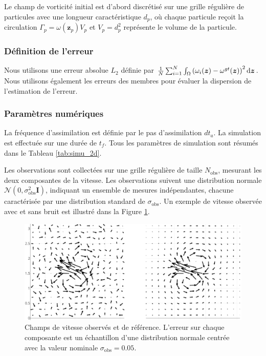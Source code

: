Le champ de vorticité initial est d'abord discrétisé sur une grille régulière de particules avec une longueur caractéristique \(d_p\), où chaque particule reçoit la circulation \(\Gamma_p = \omega(\bm{z}_p) V_p\) et \(V_p = d_p^2\) représente le volume de la particule.

\subsubsection{Définition de l'erreur}

Nous utilisons une erreur absolue \(L_2\) définie par $ \frac{1}{N} \sum_{i = 1}^{N} \int_\Omega \left(\omega_i(\bm{z}) - \omega^{gt}(\bm{z})\right)^2 \mathrm{d}\bm{z}$. Nous utilisons également les erreurs des membres pour évaluer la dispersion de l'estimation de l'erreur.

\subsubsection{Paramètres numériques}

La fréquence d'assimilation est définie par le pas d'assimilation $dt_a$. La simulation est effectuée sur une durée de $t_f$. Tous les paramètres de simulation sont résumés dans le Tableau \ref{tab:simu_2d}.

Les observations sont collectées sur une grille régulière de taille $N_{\text{obs}}$, mesurant les deux composantes de la vitesse. Les observations suivent une distribution normale $\mathcal{N}(0, \sigma_{\text{obs}}^2 \bm{I})$, indiquant un ensemble de mesures indépendantes, chacune caractérisée par une distribution standard de $\sigma_{\text{obs}}$. Un exemple de vitesse observée avec et sans bruit est illustré dans la Figure \ref{fig:velocity}.

\begin{figure}[htbp]
    \centering
    \includegraphics[width=0.8\linewidth]{images/app2d/velocity_ref_recadre.pdf}
    \caption{Champs de vitesse observés et de référence. L'erreur sur chaque composante est un échantillon d'une distribution normale centrée avec la valeur nominale $\sigma_{\text{obs}} = 0.05$.}
    \label{fig:velocity}
\end{figure}

